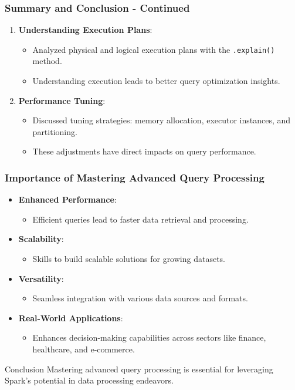 \documentclass[aspectratio=169]{beamer}
\begin{document}
\begin{frame}[fragile]
    \frametitle{Summary and Conclusion - Continued}
    \begin{enumerate}[start=4]
        \item \textbf{Understanding Execution Plans}:
            \begin{itemize}
                \item Analyzed physical and logical execution plans with the \texttt{.explain()} method.
                \item Understanding execution leads to better query optimization insights.
            \end{itemize}
        \item \textbf{Performance Tuning}:
            \begin{itemize}
                \item Discussed tuning strategies: memory allocation, executor instances, and partitioning.
                \item These adjustments have direct impacts on query performance.
            \end{itemize}
    \end{enumerate}
\end{frame}

\begin{frame}[fragile]
    \frametitle{Importance of Mastering Advanced Query Processing}
    \begin{itemize}
        \item \textbf{Enhanced Performance}:
            \begin{itemize}
                \item Efficient queries lead to faster data retrieval and processing.
            \end{itemize}
        \item \textbf{Scalability}:
            \begin{itemize}
                \item Skills to build scalable solutions for growing datasets.
            \end{itemize}
        \item \textbf{Versatility}:
            \begin{itemize}
                \item Seamless integration with various data sources and formats.
            \end{itemize}
        \item \textbf{Real-World Applications}:
            \begin{itemize}
                \item Enhances decision-making capabilities across sectors like finance, healthcare, and e-commerce.
            \end{itemize}
    \end{itemize}
    
    \begin{block}{Conclusion}
        Mastering advanced query processing is essential for leveraging Spark's potential in data processing endeavors.
    \end{block}
\end{frame}
\end{document}
